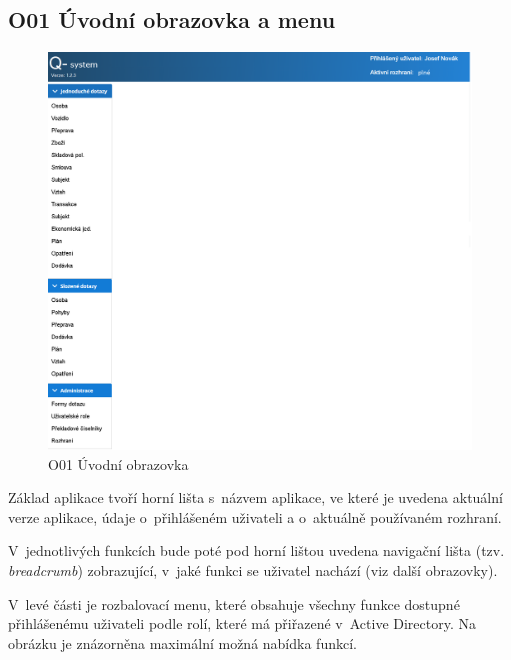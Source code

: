 \documentclass[thesis=M,czech]{FITthesis}[2019/12/23]
\begin{document}
\subsection{O01 Úvodní obrazovka a menu}
\begin{figure}[H]
  \centering
  \includegraphics[width=\textwidth]{res/screens/O01 Úvodní obrazovka a menu.png}
  \caption{O01 Úvodní obrazovka}
  \label{fig:O01 Úvodní obrazovka}
\end{figure}

\label{HorniLista}
Základ aplikace tvoří horní lišta s~názvem aplikace, ve které je uvedena aktuální verze aplikace, údaje o~přihlášeném uživateli a o~aktuálně používaném rozhraní.

V~jednotlivých funkcích bude poté pod horní lištou uvedena navigační lišta (tzv. \textit{breadcrumb}) zobrazující, v~jaké funkci se uživatel nachází (viz další obrazovky).

\label{RozbalovaciMenu}
V~levé části je rozbalovací menu, které obsahuje všechny funkce dostupné přihlášenému uživateli podle rolí, které má přiřazené v~Active Directory. Na obrázku je znázorněna maximální možná nabídka funkcí.
\end{document}
